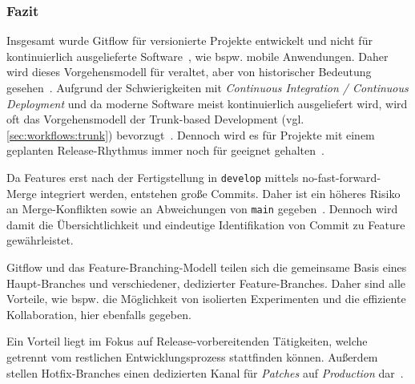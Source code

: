 \subsubsection{Fazit}

Insgesamt wurde Gitflow für versionierte Projekte entwickelt und nicht für kontinuierlich ausgelieferte Software~\cite{driessenSuccessfulGitBranching2010}, wie bspw. mobile Anwendungen. Daher wird dieses Vorgehensmodell für veraltet, aber von historischer Bedeutung gesehen~\cite{atlassianGitflowWorkflow}. Aufgrund der Schwierigkeiten mit \emph{Continuous Integration / Continuous Deployment} und da moderne Software meist kontinuierlich ausgeliefert wird, wird oft das Vorgehensmodell der Trunk-based Development (vgl. \autoref{sec:workflows:trunk}) bevorzugt~\cite{atlassianGitflowWorkflow}. Dennoch wird es für Projekte mit einem geplanten Release-Rhythmus immer noch für geeignet gehalten~\cite{atlassianGitflowWorkflow,driessenSuccessfulGitBranching2010}.

Da Features erst nach der Fertigstellung in \texttt{develop} mittels no\hyp fast\hyp forward\hyp Merge integriert werden, entstehen große Commits. Daher ist ein höheres Risiko an Merge\hyp Konflikten sowie an Abweichungen von \texttt{main} gegeben~\cite{atlassianGitflowWorkflow}. Dennoch wird damit die Übersichtlichkeit und eindeutige Identifikation von Commit zu Feature gewährleistet.

Gitflow und das Feature\hyp Branching\hyp Modell teilen sich die gemeinsame Basis eines Haupt\hyp Branches und verschiedener, dedizierter Feature\hyp Branches. Daher sind alle Vorteile, wie bspw. die Möglichkeit von isolierten Experimenten und die effiziente Kollaboration, hier ebenfalls gegeben.

Ein Vorteil liegt im Fokus auf Release\hyp vorbereitenden Tätigkeiten, welche getrennt vom restlichen Entwicklungsprozess stattfinden können. Außerdem stellen Hotfix\hyp Branches einen dedizierten Kanal für \emph{Patches} auf \emph{Production} dar~\cite{atlassianGitflowWorkflow}.
